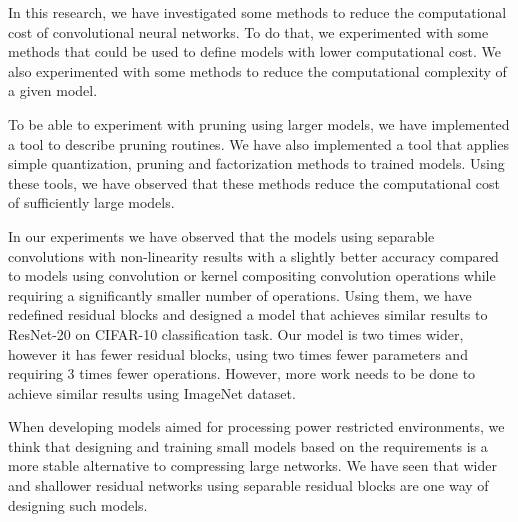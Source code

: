 
\iffalse
    What is the strongest and most important statement that you can make from your observations? 
    If you met the reader at a meeting six months from now, what do you want them to remember about your paper? 
    Refer back to problem posed, and describe the conclusions that you reached from carrying out this investigation, summarize new observations, new interpretations, and new insights that have resulted from the present work.
    Include the broader implications of your results. 
    Do not repeat word for word the abstract, introduction or discussion.
\fi

In this research, we have investigated some methods to reduce the computational cost of convolutional neural networks. To do that, we experimented with some methods that could be used to define models with lower computational cost. We also experimented with some methods to reduce the computational complexity of a given model. 

To be able to experiment with pruning using larger models, we have implemented a tool to describe pruning routines. We have also implemented a tool that applies simple quantization, pruning and factorization methods to trained models. Using these tools, we have observed that these methods reduce the computational cost of sufficiently large models.

In our experiments we have observed that the models using separable convolutions with non-linearity results with a slightly better accuracy compared to models using convolution or kernel compositing convolution operations while requiring a significantly smaller number of operations. Using them, we have redefined residual blocks and designed a model that achieves similar results to ResNet-20 on CIFAR-10 classification task. Our model is two times wider, however it has fewer residual blocks, using two times fewer parameters and requiring 3 times fewer operations. However, more work needs to be done to achieve similar results using ImageNet dataset.

When developing models aimed for processing power restricted environments, we think that designing and training small models based on the requirements is a more stable alternative to compressing large networks. We have seen that wider and shallower residual networks using separable residual blocks are one way of designing such models.
